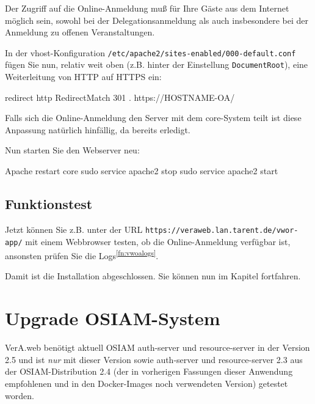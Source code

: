 \documentclass{tarentanleitung}
\newcommand{\vwiaversosiam}{2.5}
\newif\ifoa
\begin{document}
Der Zugriff auf die Online-Anmeldung muß für Ihre Gäste aus dem Internet
möglich sein, sowohl bei der Delegationsanmeldung als auch insbesondere
bei der Anmeldung zu offenen Veranstaltungen.

\begin{minipage}{\linewidth}
In der vhost-Konfiguration \texttt{/etc/apache2/sites-enabled/000-default.conf}
fügen Sie nun, relativ weit oben (z.B. hinter der Einstellung
\texttt{DocumentRoot}), eine Weiterleitung von HTTP auf HTTPS ein:

\begin{lstdump}{redirect http}
RedirectMatch 301 . https://HOSTNAME-OA/
\end{lstdump}
\end{minipage}

Falls sich die Online-Anmeldung den Server mit dem core-System teilt ist
diese Anpassung natürlich hinfällig, da bereits erledigt.

\begin{minipage}{\linewidth}
Nun starten Sie den Webserver neu:

\begin{lstdump}{Apache restart core}
sudo service apache2 stop
sudo service apache2 start
\end{lstdump}
\end{minipage}

\subsection{Funktionstest}\label{subsec:setup-oa-check}

Jetzt können Sie \dash z.B. unter der URL
\texttt{https://veraweb.lan.tarent.de/vwor-app/} \dash mit einem
Webbrowser testen, ob die Online-Anmeldung verfügbar ist, ansonsten
prüfen Sie die Logs\Hair\textsuperscript{\ref{fn:vwoalogs}}.

Damit ist die Installation abgeschlossen.
Sie können nun im Kapitel  fortfahren.

\newpage

\ifoa

\section{Upgrade OSIAM-System}\label{sec:upgrade-osiam}

VerA.web benötigt aktuell OSIAM auth-server und resource-server in
der Version \vwiaversosiam{} und ist \emph{nur} mit dieser Version
sowie auth-server und resource-server 2.3 aus der OSIAM-Distribution
2.4 (der in vorherigen Fassungen dieser Anwendung empfohlenen und in
den Docker-Images noch verwendeten Version) getestet worden.\keinumbruch
\end{document}
